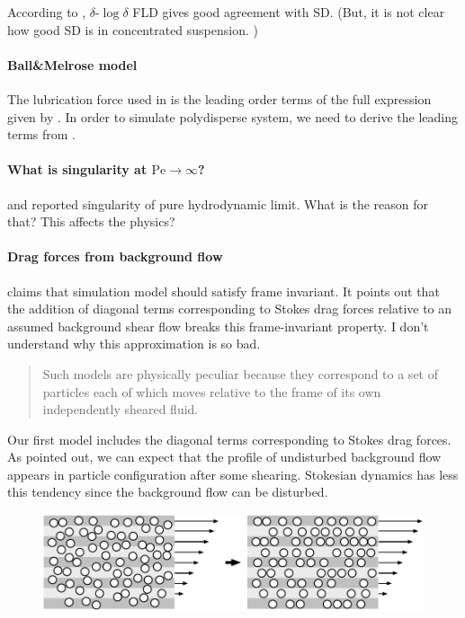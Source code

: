 \documentclass[12pt]{article}
\begin{document}
According to \citet{Kumar_2010a},
$\delta$-$\log\delta $ FLD gives
good agreement with SD.
%
(But, it is not clear
how good SD is in concentrated suspension.
)



\paragraph{Ball\&Melrose model}

The lubrication force used in \cite{Ball_1997}
is the leading order terms of 
the full expression given by \citet{Jeffrey_1992}.
%
In order to simulate  polydisperse system,
we need to derive 
the leading terms from \citet{Jeffrey_1992}.


\paragraph{What is singularity at $\mathrm{Pe}\to \infty$?}

\citet{Ball_1995}
and \citet{Melrose_1995}
reported singularity of pure hydrodynamic limit.
%
What is the reason for that?
%
This affects the physics?
%

\paragraph{Drag forces from background flow}

\citet{Ball_1997} claims that 
simulation model should satisfy frame invariant.
%
It points out that
the addition of diagonal terms corresponding to
Stokes drag forces
relative to an assumed background shear flow
breaks this frame-invariant property.
%
I don't understand why this approximation is so bad.
%
\begin{quote}
Such models are physically peculiar
because they correspond to a set of particles
each of which moves relative to the frame
of its own independently sheared fluid. 
\end{quote}

Our first model includes the diagonal terms corresponding to
Stokes drag forces.
%
As \citet{Ball_1997} pointed out,
we can expect that 
the profile of undisturbed background flow appears
in particle configuration after some shearing.
%
Stokesian dynamics has less this tendency
since the background flow can be disturbed.
\begin{figure}[htbp]
\begin{center}
\includegraphics[width=12cm]{order_with_undisturbed_shearflow.pdf} 
\end{center}
\end{figure}
\end{document}
